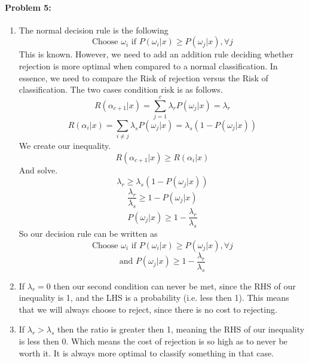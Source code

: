 \documentclass[12pt]{article}
\begin{document}
    \paragraph{Problem 5:}
    \begin{enumerate}
        \item
        The normal decision rule is the following
        \[
            \text{Choose } \omega_i \text{ if }
            P(\omega_i | x) \ge P(\omega_j | x), \forall j
        \]
        This is known. However, we need to add an addition rule
        deciding whether rejection is more optimal when compared to 
        a normal classification. In essence, we need to compare the Risk
        of rejection versus the Risk of classification. The two cases 
        condition risk is as follows.
        \[
            R(\alpha_{c+1} | x) = \sum_{j=1}^{c} \lambda_r P(\omega_j | x) = \lambda_r
        \]
        \[
            R(\alpha_{i} | x) = \sum_{i \neq j} \lambda_s P(\omega_j | x) = \lambda_s (1 - P(\omega_j | x))
        \]
        We create our inequality.
        \[
            R(\alpha_{c+1} | x) \ge R(\alpha_{i} | x)
        \]
        And solve.
        \[ \lambda_r \ge \lambda_s (1 - P(\omega_j | x)) \]
        \[ \frac{\lambda_r}{\lambda_s} \ge 1 - P(\omega_j | x) \]
        \[ P(\omega_j | x) \ge 1 - \frac{\lambda_r}{\lambda_s} \]
        So our decision rule can be written as
        \[ \text{Choose } \omega_i \text{ if }
            P(\omega_i | x) \ge P(\omega_j | x), \forall j \]
        \[ \text{and } P(\omega_j | x) \ge 1 - \frac{\lambda_r}{\lambda_s} \]
        \item
        If \( \lambda_r = 0 \) then our second condition can never be met, since the RHS of our
        inequality is 1, and the LHS is a probability (i.e. less then 1).
        This means that we will always choose to reject, since there is no cost to 
        rejecting.
        \item
        If \( \lambda_r > \lambda_s \) then the ratio is greater then 1, meaning the RHS
        of our inequality is less then 0. Which means the cost of rejection is so high as to never
        be worth it. It is always more optimal to classify something in that case.
    \end{enumerate}
\end{document}
